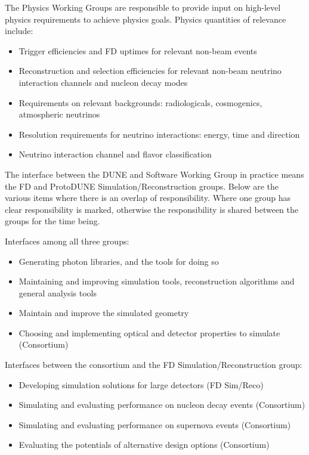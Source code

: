 The Physics Working Groups are responsible to provide input on high-level physics requirements to achieve physics goals. Physics quantities of relevance include:

\begin{itemize}
    \item Trigger efficiencies and FD uptimes for relevant non-beam events
    \item Reconstruction and selection efficiencies for relevant non-beam neutrino interaction channels and nucleon decay modes
    \item Requirements on relevant backgrounds: radiologicals, cosmogenics, atmospheric neutrinos
    \item Resolution requirements for neutrino interactions: energy, time and direction
    \item Neutrino interaction channel and flavor classification 
\end{itemize}

The interface between the DUNE \single {} and Software Working Group in practice means the FD and ProtoDUNE Simulation/Reconstruction groups. Below are the various items where there is an overlap of responsibility. Where one group has clear responsibility is marked, otherwise the responsibility is shared between the groups for the time being. 

Interfaces among all three groups:

\begin{itemize}
    \item Generating photon libraries, and the tools for doing so
    \item Maintaining and improving simulation tools, reconstruction algorithms and general analysis tools
    \item Maintain and improve the simulated geometry
    \item Choosing and implementing optical and detector properties to simulate (Consortium)
\end{itemize}

Interfaces between the consortium and the FD Simulation/Reconstruction group:
\begin{itemize}
    \item Developing simulation solutions for large detectors (FD Sim/Reco)
    \item Simulating and evaluating performance on nucleon decay events (Consortium)
    \item Simulating and evaluating performance on supernova events (Consortium)
    \item Evaluating the potentials of alternative design options (Consortium)
\end{itemize}

